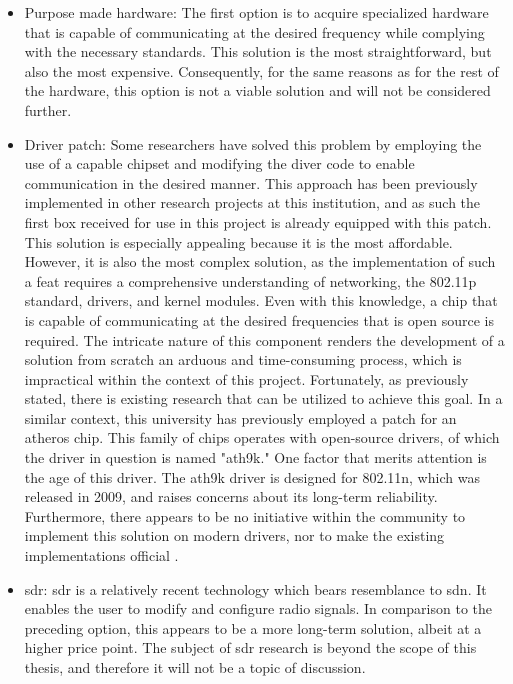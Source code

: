\begin{itemize}
    \item Purpose made hardware: The first option is to acquire specialized hardware that is capable of communicating at the desired frequency while complying with the necessary standards. This solution is the most straightforward, but also the most expensive. Consequently, for the same reasons as for the rest of the hardware, this option is not a viable solution and will not be considered further.
    \item Driver patch: Some researchers have solved this problem\cite{noauthor_httpsgitlabcomhpi-potsdamosmg5--linux11p--linuxid14_nodate} by employing the use of a capable chipset and modifying the diver code to enable communication in the desired manner. This approach has been previously implemented in other research projects at this institution, and as such the first box received for use in this project is already equipped with this patch.
    This solution is especially appealing because it is the most affordable. However, it is also the most complex solution, as the implementation of such a feat requires a comprehensive understanding of networking, the 802.11p standard, drivers, and kernel modules. Even with this knowledge, a chip that is capable of communicating at the desired frequencies that is open source is required.
    The intricate nature of this component renders the development of a solution from scratch an arduous and time-consuming process, which is impractical within the context of this project. Fortunately, as previously stated, there is existing research that can be utilized to achieve this goal. In a similar context, this university has previously employed a patch for an atheros chip. This family of chips operates with open-source drivers, of which the driver in question is named "ath9k."
    One factor that merits attention is the age of this driver. The ath9k driver is designed for 802.11n, which was released in 2009, and raises concerns about its long-term reliability. Furthermore, there appears to be no initiative within the community to implement this solution on modern drivers, nor to make the existing implementations official \cite{noauthor_ath10k_2023}. 
    \item \gls{sdr}: \gls{sdr} is a relatively recent technology which bears resemblance to \gls{sdn}. It enables the user to modify and configure radio signals. In comparison to the preceding option, this appears to be a more long-term solution, albeit at a higher price point. The subject of \gls{sdr} research is beyond the scope of this thesis, and therefore it will not be a topic of discussion.
\end{itemize}

